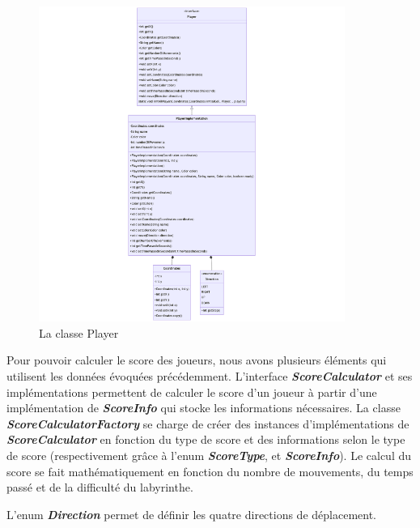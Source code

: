 \begin{figure}[h!]
    \centering
    \includegraphics[width=10cm]{ressources/Implementation/Labyrinthe/Modele/Player.png}
    \caption{La classe Player}
    \label{fig:Player}
\end{figure}

Pour pouvoir calculer le score des joueurs, nous avons plusieurs éléments qui
utilisent les données évoquées précédemment. L'interface
\textbf{\textit{ScoreCalculator}} et ses implémentations permettent de calculer
le score d'un joueur à partir d'une implémentation de
\textbf{\textit{ScoreInfo}} qui stocke les informations nécessaires. La classe
\textbf{\textit{ScoreCalculatorFactory}} se charge de créer des instances
d'implémentations de \textbf{\textit{ScoreCalculator}} en fonction du type de
score et des informations selon le type de score (respectivement grâce à l'enum
\textbf{\textit{ScoreType}}, et \textbf{\textit{ScoreInfo}}). Le calcul du
score se fait mathématiquement en fonction du nombre de mouvements, du temps
passé et de la difficulté du labyrinthe.

L'enum \textbf{\textit{Direction}} permet de définir les quatre directions de
déplacement.
